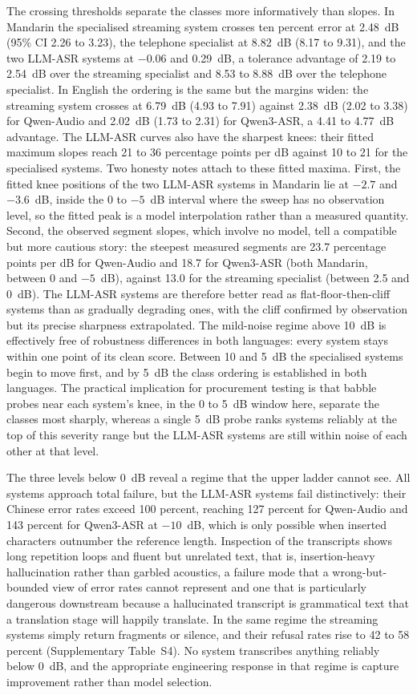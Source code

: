 The crossing thresholds separate the classes more informatively than
slopes. In Mandarin the specialised streaming system crosses ten percent
error at 2.48~dB (95\% CI 2.26 to 3.23), the telephone specialist at
8.82~dB (8.17 to 9.31), and the two LLM-ASR systems at $-0.06$ and
0.29~dB, a tolerance
advantage of 2.19 to 2.54~dB over the streaming specialist and 8.53 to
8.88~dB
over the telephone specialist. In English the ordering is the same but the
margins widen: the streaming system crosses at 6.79~dB (4.93 to 7.91)
against
2.38~dB (2.02 to 3.38) for Qwen-Audio and 2.02~dB (1.73 to 2.31) for
Qwen3-ASR,
a 4.41 to 4.77~dB advantage. The LLM-ASR curves also have the sharpest knees:
their fitted maximum slopes reach 21 to 36 percentage points per dB
against 10 to 21 for the specialised systems. Two honesty notes attach to
these fitted maxima. First, the fitted knee positions of the two LLM-ASR
systems in Mandarin lie at $-2.7$ and $-3.6$~dB, inside the 0 to $-5$~dB
interval where the sweep has no observation level, so the fitted peak is a
model interpolation rather than a measured quantity. Second, the observed
segment slopes, which involve no model, tell a compatible but more
cautious story: the steepest measured segments are 23.7 percentage points
per dB for Qwen-Audio and 18.7 for Qwen3-ASR (both Mandarin, between 0 and
$-5$~dB), against 13.0 for the streaming specialist (between 2.5 and
0~dB). The LLM-ASR systems are therefore better read as
flat-floor-then-cliff systems than as gradually degrading ones, with the
cliff confirmed by observation but its precise sharpness extrapolated. The
mild-noise
regime above 10~dB is effectively free of robustness differences in both
languages: every system stays within one point of its clean score. Between
10 and 5~dB the specialised systems begin to move first, and by 5~dB the
class ordering is established in both languages. The practical implication
for procurement testing is that babble probes near each system's knee, in
the 0 to 5~dB window here, separate the classes most sharply, whereas a
single 5~dB probe ranks systems reliably at the top of this severity range
but the LLM-ASR systems are still within noise of each other at that level.

The three levels below 0~dB reveal a regime that the
upper ladder cannot see. All systems approach total
failure, but the LLM-ASR systems fail distinctively: their Chinese error
rates exceed 100 percent, reaching 127 percent for Qwen-Audio and 143
percent for Qwen3-ASR at $-10$~dB, which is only possible when inserted
characters outnumber the reference length. Inspection of the transcripts
shows long repetition loops and fluent but unrelated text, that is,
insertion-heavy hallucination rather than garbled acoustics, a failure mode
that a wrong-but-bounded view of error rates cannot represent and one that
is particularly dangerous downstream because a hallucinated transcript is
grammatical text that a translation stage will happily translate. In the
same regime the streaming systems simply return fragments or silence, and
their refusal rates rise to 42 to 58 percent (Supplementary Table~S4).
No system transcribes anything reliably below 0~dB, and the appropriate
engineering response in that regime is capture improvement rather than
model selection.

